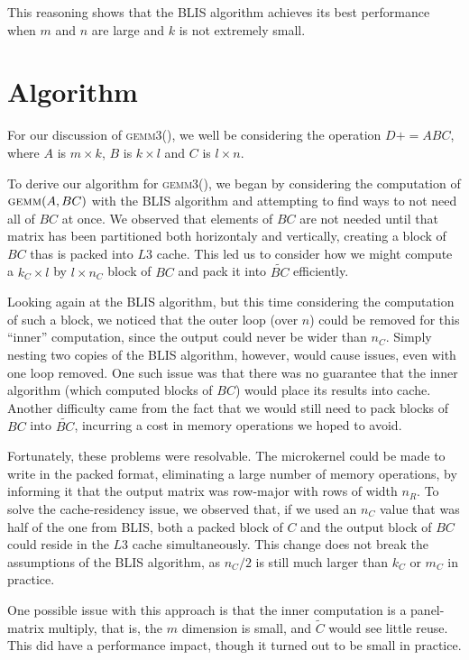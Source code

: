 \documentclass[12pt]{article}
\newcommand*{\pluseq}{\mathrel{{+}{=}}}
\newcommand*{\gemmt}{{\textsc{gemm3()}}}
\begin{document}
This reasoning shows that the BLIS algorithm achieves its best performance when $m$ and $n$ are large and $k$ is not extremely small.

\section{Algorithm}
For our discussion of \gemmt{}, we well be considering the operation $D \pluseq ABC$, where $A$ is $m \times k$, $B$ is $k \times l$ and $C$ is $l \times n$.

To derive our algorithm for \gemmt{}, we began by considering the computation of $\textsc{gemm}(A, BC)$ with the BLIS algorithm and attempting to find ways to not need all of $BC$ at once.
We observed that elements of $BC$ are not needed until that matrix has been partitioned both horizontaly and vertically, creating a block of $BC$ thas is packed into $L3$ cache.
This led us to consider how we might compute a $k_C \times l$ by $l \times n_C$ block of $BC$ and pack it into $\tilde{BC}$ efficiently.

Looking again at the BLIS algorithm, but this time considering the computation of such a block, we noticed that the outer loop (over $n$) could be removed for this ``inner'' computation, since the output could never be wider than $n_C$.
Simply nesting two copies of the BLIS algorithm, however, would cause issues, even with one loop removed.
One such issue was that there was no guarantee that the inner algorithm (which computed blocks of $BC$) would place its results into cache.
Another difficulty came from the fact that we would still need to pack blocks of $BC$ into $\tilde{BC}$, incurring a cost in memory operations we hoped to avoid.

Fortunately, these problems were resolvable.
The microkernel could be made to write in the packed format, eliminating a large number of memory operations, by informing it that the output matrix was row-major with rows of width $n_R$.
To solve the cache-residency issue, we observed that, if we used an $n_C$ value that was half of the one from BLIS, both a packed block of $C$ and the output block of $BC$ could reside in the $L3$ cache simultaneously.
This change does not break the assumptions of the BLIS algorithm, as $n_C/2$ is still much larger than $k_C$ or $m_C$ in practice.

One possible issue with this approach is that the inner computation is a panel-matrix multiply, that is, the $m$ dimension is small, and $\tilde{C}$ would see little reuse.
This did have a performance impact, though it turned out to be small in practice.
\end{document}

